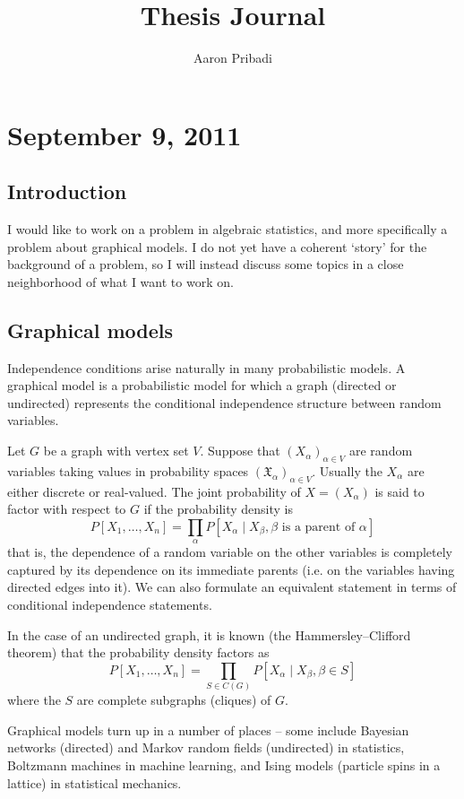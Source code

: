 \documentclass[11pt]{article}
\title{Thesis Journal}
\author{Aaron Pribadi}
\date{}
\newcommand*{\X}{\mathfrak{X}}
\begin{document}
\maketitle

\section{September 9, 2011}

\subsection{Introduction}

I would like to work on a problem in algebraic statistics, and more specifically
a problem about graphical models.  I do not yet have a coherent `story' for the
background of a problem, so I will instead discuss some topics in a close
neighborhood of what I want to work on.


\subsection{Graphical models}

Independence conditions arise naturally in many probabilistic models.  A
graphical model is a probabilistic model for which a graph (directed or
undirected) represents the conditional independence structure between random
variables. 

Let $G$ be a graph with vertex set $V$.  Suppose that $(X_\alpha)_{\alpha \in
V}$ are random variables taking values in probability spaces
$(\X_\alpha)_{\alpha \in V}$.  Usually the $X_\alpha$ are either discrete or
real-valued.  The joint probability of $X = (X_\alpha)$ is said to
factor with respect to $G$ if the probability density is
\[
    P[X_1, \ldots, X_n] = 
        \prod_\alpha P[X_\alpha \mid X_\beta, \beta \text{ is a parent of }
        \alpha]
\]
that is, the dependence of a random variable on the other variables is
completely captured by its dependence on its immediate parents (i.e. on the
variables having directed edges into it).  We can also formulate an equivalent
statement in terms of conditional independence statements.

In the case of an undirected graph, it is known (the Hammersley–Clifford
theorem) that the probability density factors as
\[
    P[X_1, \ldots, X_n] = 
        \prod_{S \in C(G)} P[X_\alpha \mid X_\beta, \beta \in S]
\]
where the $S$ are complete subgraphs (cliques) of $G$.

Graphical models turn up in a number of places -- some include Bayesian networks
(directed) and Markov random fields (undirected) in statistics, Boltzmann
machines in machine learning, and Ising models (particle spins in a lattice) in
statistical mechanics.
\end{document}
